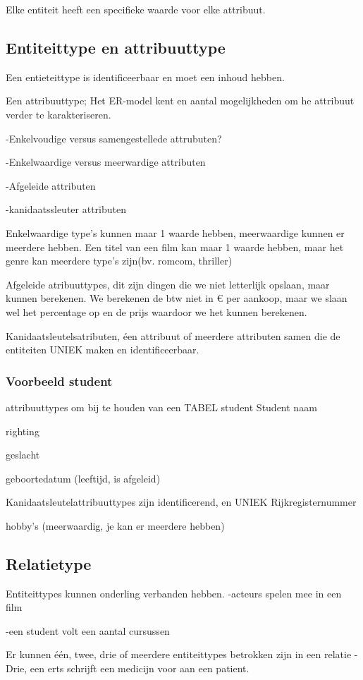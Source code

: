 \documentclass{article}
\begin{document}
Elke entiteit heeft een specifieke waarde voor elke attribuut.

 \subsection{Entiteittype en attribuuttype}
 Een entieteittype is identificeerbaar en moet een inhoud hebben.


Een attribuuttype;
Het ER-model kent en aantal mogelijkheden om he attribuut verder te karakteriseren.

	-Enkelvoudige versus samengestellede attrubuten?
	
	-Enkelwaardige versus meerwardige attributen

	-Afgeleide attributen

	-kanidaatssleuter attributen

Enkelwaardige type's kunnen maar 1 waarde hebben, meerwaardige kunnen er meerdere hebben. Een titel van een film kan maar 1 waarde hebben, maar het genre kan meerdere type's zijn(bv. romcom, thriller)

Afgeleide atribuuttypes, dit zijn dingen die we niet letterlijk opslaan, maar kunnen berekenen. We berekenen de btw niet in € per aankoop, maar we slaan wel het percentage op en de prijs waardoor we het kunnen berekenen.

Kanidaatsleutelsatributen, éen attribuut of meerdere attributen samen die de entiteiten UNIEK maken en identificeerbaar.
\subsubsection{Voorbeeld student}
attribuuttypes om bij te houden van een TABEL student
Student
naam

righting

geslacht

geboortedatum
(leeftijd, is afgeleid)

Kanidaatsleutelattribuuttypes zijn identificerend, en UNIEK
Rijkregisternummer

hobby's (meerwaardig, je kan er meerdere hebben)


\subsection{Relatietype}
Entiteittypes kunnen onderling verbanden hebben.
	-acteurs spelen mee in een film

	-een student volt een aantal cursussen

Er kunnen één, twee, drie of meerdere entiteittypes betrokken zijn in een relatie
	-Drie, een erts schrijft een medicijn voor aan een patient.
\end{document}

